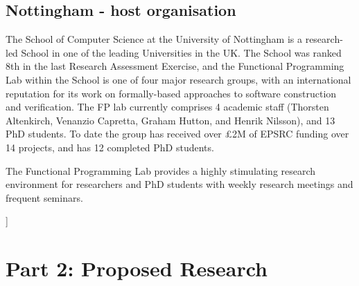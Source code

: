 \documentclass[a4paper]{article}
\begin{document}
\subsection*{Nottingham - host organisation}

The School of Computer Science at the University of Nottingham
is a research-led School in one of the leading Universities in
the UK.	 The School was ranked 8th in the last Research Assessment
Exercise, and the Functional Programming Lab within the School is
one of four major research groups, with an international reputation
for its work on formally-based approaches to software construction
and verification.  The FP lab currently comprises 4 academic staff
(Thorsten Altenkirch, Venanzio Capretta, Graham Hutton, and Henrik
Nilsson), and 13 PhD students.  To date the
group has received over \pounds 2M of EPSRC funding over 14 projects,
and has 12 completed PhD students.

The Functional Programming Lab provides a highly stimulating
research environment for researchers and PhD students with weekly
research meetings and frequent seminars. %




\vspace{1em}
]




{\small 
{}
}


\newpage

\section*{Part 2: Proposed Research}
\end{document}
